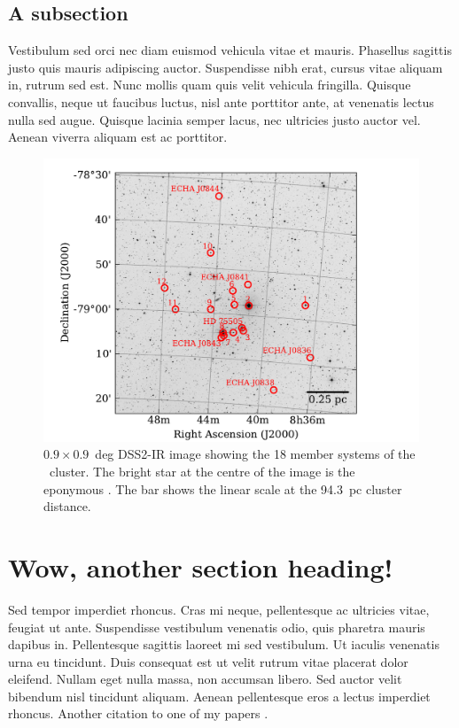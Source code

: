 \subsection{A subsection}

Vestibulum sed orci nec diam euismod vehicula vitae et mauris. Phasellus sagittis justo quis mauris adipiscing auctor. Suspendisse nibh erat, cursus vitae aliquam in, rutrum sed est. Nunc mollis quam quis velit vehicula fringilla. Quisque convallis, neque ut faucibus luctus, nisl ante porttitor ante, at venenatis lectus nulla sed augue. Quisque lacinia semper lacus, nec ultricies justo auctor vel. Aenean viverra aliquam est ac porttitor.

\begin{figure}[t!]
\vspace{-4mm}
   \centering
   \includegraphics[width=\textwidth]{etacha} 
   \caption[{The  open cluster}]{$0.9\times0.9$~deg DSS2-IR image showing the 18 member systems of the \echa\ cluster. The bright star at the centre of the image is the eponymous \echa. The bar shows the linear scale at the 94.3~pc cluster distance.}
   \label{fig:etacha}
\end{figure}

\section{Wow, another section heading!}

Sed tempor imperdiet rhoncus. Cras mi neque, pellentesque ac ultricies vitae, feugiat ut ante. Suspendisse vestibulum venenatis odio, quis pharetra mauris dapibus in. Pellentesque sagittis laoreet mi sed vestibulum. Ut iaculis venenatis urna eu tincidunt. Duis consequat est ut velit rutrum vitae placerat dolor eleifend. Nullam eget nulla massa, non accumsan libero. Sed auctor velit bibendum nisl tincidunt aliquam. Aenean pellentesque eros a lectus imperdiet rhoncus. Another citation to one of my papers \citep{Riedel11}.

